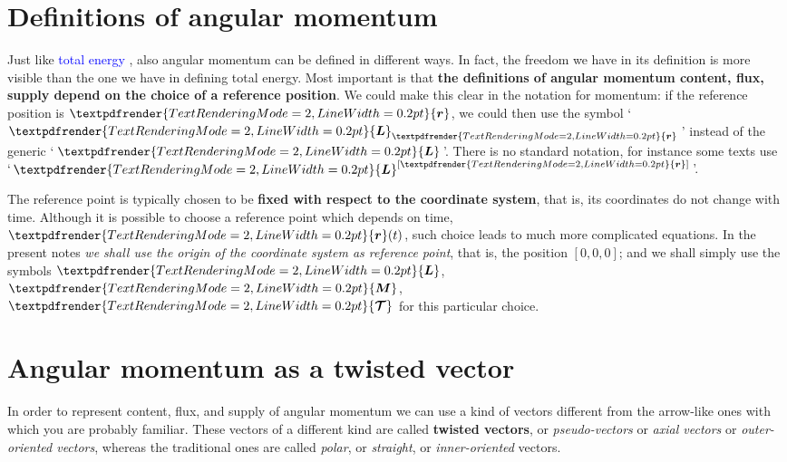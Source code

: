 \documentclass[a4paper,12pt,%
onecolumn,oneside,%
british%
]{memoir}
\renewcommand*{\bm}[1]{\textpdfrender{TextRenderingMode=2,LineWidth=0.2pt}{\boldsymbol{#1}}}
\renewcommand*{\|}[1][]{\nonscript\:#1\vert\nonscript\:\mathopen{}}
\newcommand*{\sect}{\S}%
\renewcommand*{\autoref}[3][\sect\,\ref]{\textcolor{blue}{#3}
\raisebox{0.6ex}{\color{blue}\miniscule%
\faIcon{angle-right}%
\;#1{#2}\;p.\,\pageref{#2}}}
\newcommand*{\yr}{\bm{r}}
\newcommand*{\yL}{\bm{L}}%
\newcommand*{\yM}{\bm{M}}%
\newcommand*{\ytoo}{\mathcal{T}}%
\newcommand*{\yto}{\bm{\ytoo}}%
\begin{document}
\section{Definitions of angular momentum}
\label{sec:angmomentum_defs}

Just like \autoref{sec:energy_defs}{total energy}, also angular momentum can be defined in different ways. In fact, the freedom we have in its definition is more visible than the one we have in defining total energy. Most important is that \textbf{the definitions of angular momentum content, flux, supply depend on the choice of a reference position}. We could make this clear in the notation for momentum: if the reference position is $\yr$, we could then use the symbol \enquote*{\,$\yL_{\yr}$\,} instead of the generic \enquote*{\,$\yL$\,}. There is no standard notation, for instance some texts use \enquote*{\,$\yL^{[\yr]}$\,}.

The reference point is typically chosen to be \textbf{fixed with respect to the coordinate system}, that is, its coordinates do not change with time. Although it is possible to choose a reference point which depends on time, $\yr(t)$, such choice leads to much more complicated equations. In the present notes \emph{we shall use the origin of the coordinate system as reference point}, that is, the position $[0, 0, 0]$; and we shall simply use the symbols $\yL$, $\yM$, $\yto$ for this particular choice.


\section{Angular momentum as a twisted vector}
\label{sec:twisted_vec}

In order to represent content, flux, and supply of angular momentum we can use a kind of vectors different from the arrow-like ones with which you are probably familiar. These vectors of a different kind are called \textbf{twisted vectors}, or \emph{pseudo-vectors} or \emph{axial vectors} or \emph{outer-oriented vectors}, whereas the traditional ones are called  \emph{polar}, or \emph{straight}, or \emph{inner-oriented} vectors.
\end{document}
